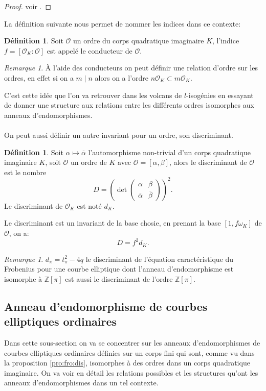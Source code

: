 \documentclass[10pt,a4paper]{book}
\theoremstyle{plain}
\theoremstyle{definition}
\theoremstyle{definition}
\theoremstyle{definition}
\theoremstyle{definition}
\newtheorem{defi}[thm]{Définition}
\theoremstyle{remark}
\newtheorem{rem}[thm]{Remarque}
\theoremstyle{remark}
\theoremstyle{definition}
\begin{document}
\begin{proof}
voir \cite[lemma 7.7.2]{Cox89}.
\end{proof}

La définition suivante nous permet de nommer les indices dans ce contexte:
\begin{defi}
Soit $\mathcal{O}$ un ordre du corps quadratique imaginaire $K$, l'indice $f=[\mathcal{O}_K : \mathcal{O}]$ est appelé le conducteur de $\mathcal{O}$.
\end{defi}

\begin{rem}
\`A l'aide des conducteurs on peut définir une relation d'ordre sur les ordres, en effet si on a $m \mid n$ alors on a l'ordre $n\mathcal{O}_K \subset m\mathcal{O}_K$.
\end{rem}

C'est cette idée que l'on va retrouver dans les volcans de $l$-isogénies en essayant de donner une structure aux relations entre les différents ordres isomorphes aux anneaux d'endomorphismes.
\\
\\
On peut aussi définir un autre invariant pour un ordre, son discriminant.

\begin{defi}
Soit $\alpha \mapsto \overline{\alpha}$ l'automorphisme non-trivial d'un corps quadratique imaginaire $K$, soit $\mathcal{O}$ un ordre de $K$ avec $\mathcal{O}=[\alpha, \beta]$, alors le discriminant de $\mathcal{O}$ est le nombre 
\[D= \left( \det \left( 
\begin{array}{cc}
\alpha & \beta\\
\overline{\alpha} & \overline{\beta}
\end{array} 
\right) \right)^2. \]
Le discriminant de $\mathcal{O}_K$ est noté $d_K$.
\end{defi}
Le discriminant est un invariant de la base chosie, en prenant la base $[1, f 
\omega_K]$ de $\mathcal{O}$, on a:
\[D=f^2d_K.\]

\begin{rem}
$d_{\pi}=t_{\pi}^2-4q$ le discriminant de l'équation caractéristique du 
Frobenius pour une courbe elliptique dont l'anneau d'endomorphisme est 
isomorphe à $\mathbb{Z}[\pi]$ est aussi le discriminant de l'ordre $\mathbb{Z}
[\pi]$.
\end{rem}



\subsection{Anneau d'endomorphisme de courbes elliptiques ordinaires}
Dans cette sous-section on va se concentrer sur les anneaux d'endomorphismes de courbes elliptiques ordinaires définies sur un corps fini qui sont, comme vu dans la proposition \ref{pro:fro:dis}, isomorphes à des ordres dans un corps quadratique imaginaire. On va voir en détail les relations possibles et les structures qu'ont les anneaux d'endomorphismes dans un tel contexte.
\end{document}
